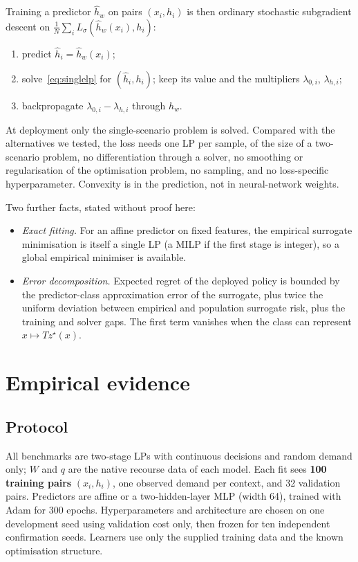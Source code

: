 \documentclass[11pt,a4paper]{article}
\theoremstyle{remark}
\newcommand{\hh}{\hat h}
\newcommand{\Ls}{L_\sigma}
\begin{document}
Training a predictor $\hh_w$ on pairs $(x_i,h_i)$ is then ordinary stochastic
subgradient descent on $\frac1N\sum_i\Ls(\hh_w(x_i),h_i)$:
\begin{enumerate}
\item predict $\hh_i=\hh_w(x_i)$;
\item solve~\eqref{eq:singlelp} for $(\hh_i,h_i)$; keep its value and the
      multipliers $\lambda_{0,i}$, $\lambda_{h,i}$;
\item backpropagate $\lambda_{0,i}-\lambda_{h,i}$ through $\hh_w$.
\end{enumerate}
At deployment only the single-scenario problem is solved. Compared with the
alternatives we tested, the loss needs one LP per sample, of the size of a two-scenario problem, no differentiation through a solver, no smoothing or
regularisation of the optimisation problem, no sampling, and no loss-specific
hyperparameter. Convexity is in the prediction, not in neural-network weights.

Two further facts, stated without proof here:
\begin{itemize}
\item \emph{Exact fitting.} For an affine predictor on fixed features, the
      empirical surrogate minimisation is itself a single LP (a MILP if the
      first stage is integer), so a global empirical minimiser is available.
\item \emph{Error decomposition.} Expected regret of the deployed policy is
      bounded by the predictor-class approximation error of the surrogate, plus
      twice the uniform deviation between empirical and population surrogate
      risk, plus the training and solver gaps. The first term vanishes when
      the class can represent $x\mapsto Tz^\star(x)$.
\end{itemize}

\section{Empirical evidence}\label{sec:empirics}

\subsection{Protocol}

All benchmarks are two-stage LPs with continuous decisions and random demand
only; $W$ and $q$ are the native recourse data of each model. Each fit sees
\textbf{100 training pairs} $(x_i,h_i)$, one observed demand per context, and 32
validation pairs. Predictors are affine or a two-hidden-layer MLP (width 64),
trained with Adam for 300 epochs. Hyperparameters and architecture are chosen on
one development seed using validation cost only, then frozen for ten
independent confirmation seeds. Learners use only the supplied training data
and the known optimisation structure.
\end{document}
